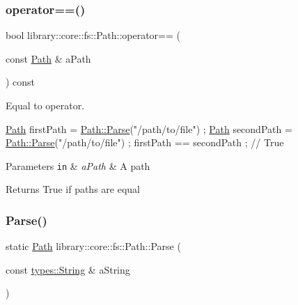 \subsubsection{\texorpdfstring{operator==()}{operator==()}}
{\footnotesize\ttfamily bool library\+::core\+::fs\+::\+Path\+::operator== (\begin{DoxyParamCaption}\item[{const \hyperlink{classlibrary_1_1core_1_1fs_1_1_path}{Path} \&}]{a\+Path }\end{DoxyParamCaption}) const}



Equal to operator. 


\begin{DoxyCode}
\hyperlink{classlibrary_1_1core_1_1fs_1_1_path_aaba9a8e0153813f08f78f1c3275734a4}{Path} firstPath = \hyperlink{classlibrary_1_1core_1_1fs_1_1_path_aebf5bd3af83e0b7376616e146f3e55df}{Path::Parse}(\textcolor{stringliteral}{"/path/to/file"}) ;
\hyperlink{classlibrary_1_1core_1_1fs_1_1_path_aaba9a8e0153813f08f78f1c3275734a4}{Path} secondPath = \hyperlink{classlibrary_1_1core_1_1fs_1_1_path_aebf5bd3af83e0b7376616e146f3e55df}{Path::Parse}(\textcolor{stringliteral}{"/path/to/file"}) ;
firstPath == secondPath ; \textcolor{comment}{// True}
\end{DoxyCode}



\begin{DoxyParams}[1]{Parameters}
\mbox{\tt in}  & {\em a\+Path} & A path \\
\hline
\end{DoxyParams}
\begin{DoxyReturn}{Returns}
True if paths are equal 
\end{DoxyReturn}
\mbox{\label{classlibrary_1_1core_1_1fs_1_1_path_aebf5bd3af83e0b7376616e146f3e55df}} 
\subsubsection{\texorpdfstring{Parse()}{Parse()}}
{\footnotesize\ttfamily static \hyperlink{classlibrary_1_1core_1_1fs_1_1_path}{Path} library\+::core\+::fs\+::\+Path\+::\+Parse (\begin{DoxyParamCaption}\item[{const \hyperlink{classlibrary_1_1core_1_1types_1_1_string}{types\+::\+String} \&}]{a\+String }\end{DoxyParamCaption})\hspace{0.3cm}{\ttfamily [static]}}



